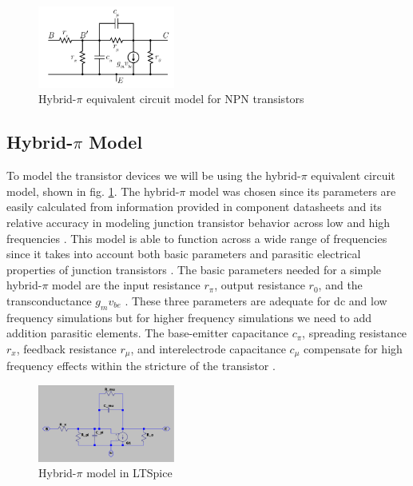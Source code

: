 \documentclass[conference]{IEEEtran}
\begin{document}
\begin{figure}[htbp]
    \centerline{\includegraphics[width=0.4\textwidth]{figures/hybrid-pi.png}}
    \caption{Hybrid-$\pi$ equivalent circuit model for NPN transistors}
    \label{fig:hybrid-pi-model}
\end{figure}

\subsection{Hybrid-$\pi$ Model}

To model the transistor devices we will be using the hybrid-$\pi$ equivalent circuit model, shown in fig. \ref{fig:hybrid-pi-model}.
The hybrid-$\pi$ model was chosen since its parameters are easily calculated from information provided in component datasheets and
its relative accuracy in modeling junction transistor behavior across low and high frequencies \cite{Sharma1989,Malik1990}. This
model is able to function across a wide range of frequencies since it takes into account both basic parameters and parasitic
electrical properties of junction transistors \cite{Sharma1989}. The basic parameters needed for a simple hybrid-$\pi$ model are
the input resistance $r_\pi$, output resistance $r_0$, and the transconductance  $g_{m}v_{be}$ \cite{Malik1990}. These
three parameters are adequate for dc and low frequency simulations but for higher frequency simulations we need to add addition
parasitic elements. The base-emitter capacitance $c_\pi$, spreading resistance $r_x$, feedback resistance $r_\mu$, and interelectrode
capacitance $c_\mu$ compensate for high frequency effects within the stricture of the transistor \cite{Sharma1989}.

\begin{figure}[htbp]
    \centerline{\includegraphics[width=0.4\textwidth]{figures/LTSpice-H-pi.png}}
    \caption{Hybrid-$\pi$ model in LTSpice}
    \label{fig:LTSpice-H-pi}
\end{figure}
\end{document}
